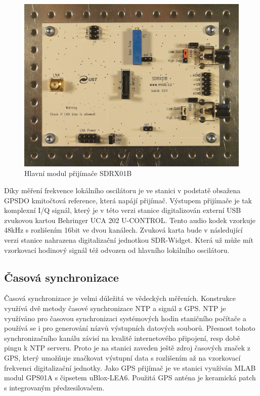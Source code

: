 \documentclass[12pt,a4paper,oneside]{article}
\begin{document}
\begin{figure}[htbp]
\begin{center}
\includegraphics [width=120mm] {./img/SDRX01B_Top_Big.JPG} 
\end{center}
\caption{Hlavní modul přijímače SDRX01B}
\end{figure}

Díky měření frekvence lokálního oscilátoru je ve stanici v podstatě obsažena GPSDO kmitočtová reference, která napájí přijímač. Výstupem přijímače je tak komplexní I/Q signál, který je v této verzi stanice digitalizován externí USB zvukovou kartou Behringer UCA 202 U-CONTROL. Tento audio kodek vzorkuje 48kHz s rozlišením 16bit ve dvou kanálech.  Zvuková karta bude v následující verzi stanice nahrazena digitalizační jednotkou SDR-Widget. Která už může mít vzorkovací hodinový signál též odvozen od hlavního lokálního oscilátoru. 

\subsection{Časová synchronizace}

Časová synchronizace je velmi dúležitá ve vědeckých měřeních. Konstrukce využívá dvě metody časové synchronizace NTP a signál z GPS.  NTP je využíváno pro časovou synchronizaci systémových hodin staničního počítače a používá se i pro generování názvů výstupních datových souborů. Přesnost tohoto synchronizačního kanálu závisí na kvalitě internetového připojení, resp době pingu k NTP serveru.  Proto je na stanici zaveden ještě zdroj časových značek z GPS, který umožňuje značkovat výstupní data s rozlišením až na vzorkovací frekvenci digitalizační jednotky. 
Jako GPS přijímač je ve stanici využíván MLAB modul GPS01A s čipsetem uBlox-LEA6. Použitá GPS anténa je keramická patch s integrovaným předzesilovačem.
\end{document}
